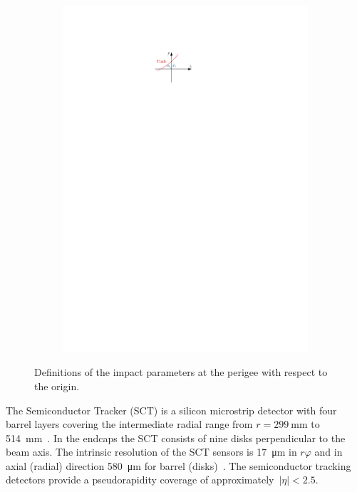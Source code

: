 \begin{figure}[htb]
\begin{subfigure}[t]{0.48\textwidth}
    \centering \includegraphics{./figures/atlas/impact_params_d0.pdf}
    \label{fig:transverse_impact_param}
  \end{subfigure}
  \caption{Definitions of the impact parameters at the perigee with respect to
    the origin.}
  \label{fig:impact_params}
\end{figure}

The Semiconductor Tracker (SCT) is a silicon microstrip detector with four
barrel layers covering the intermediate radial range from
$r = \SI{299}{\milli\metre}$ to \SI{514}{mm}~\cite{atlas_detector}. In the
endcaps the SCT consists of nine disks perpendicular to the beam axis. The
intrinsic resolution of the SCT sensors is \SI{17}{\micro\metre} in $r\varphi$
and in axial (radial) direction \SI{580}{\micro\metre} for barrel
(disks)~\cite{atlas_detector}. The semiconductor tracking detectors provide a
pseudorapidity coverage of approximately~$|\eta| < 2.5$.


